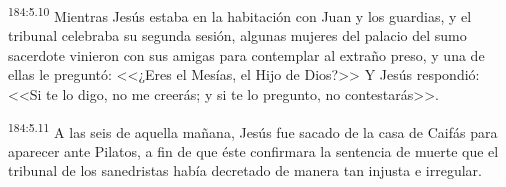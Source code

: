 \par 
\textsuperscript{184:5.10} Mientras Jesús estaba en la habitación con Juan y los guardias, y el tribunal celebraba su segunda sesión, algunas mujeres del palacio del sumo sacerdote vinieron con sus amigas para contemplar al extraño preso, y una de ellas le preguntó: <<¿Eres el Mesías, el Hijo de Dios?>> Y Jesús respondió: <<Si te lo digo, no me creerás; y si te lo pregunto, no contestarás>>.

\par 
\textsuperscript{184:5.11} A las seis de aquella mañana, Jesús fue sacado de la casa de Caifás para aparecer ante Pilatos, a fin de que éste confirmara la sentencia de muerte que el tribunal de los sanedristas había decretado de manera tan injusta e irregular.